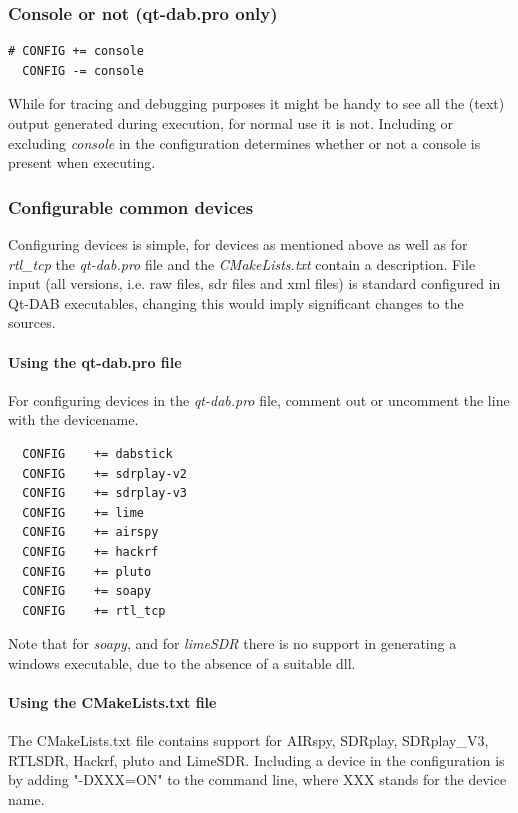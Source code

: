 \documentclass[12pt]{article}
\begin{document}
\subsubsection{Console or not (qt-dab.pro only)}
{\small
\begin{verbatim}
# CONFIG += console
  CONFIG -= console
\end{verbatim}
}

While for tracing and debugging purposes it might be handy to see
all the (text) output generated during execution, for normal
use it is not.
Including or excluding  {\em console} in the configuration
determines whether or not a console is present when executing.

\subsubsection{Configurable common devices}
Configuring devices is simple, for devices as mentioned above
as well as for {\em rtl\_tcp} the {\em qt-dab.pro} file 
and the {\em CMakeLists.txt} contain a description.
File input (all versions, i.e. raw files, sdr files and xml files) is
standard configured in Qt-DAB executables,
changing this would imply significant changes to the sources.

\paragraph{Using the qt-dab.pro file}
For configuring devices in the {\em qt-dab.pro} file, comment out or
uncomment the line with the devicename.
\begin{verbatim}
  CONFIG	+= dabstick
  CONFIG	+= sdrplay-v2
  CONFIG	+= sdrplay-v3
  CONFIG	+= lime
  CONFIG	+= airspy
  CONFIG	+= hackrf
  CONFIG	+= pluto
  CONFIG	+= soapy
  CONFIG	+= rtl_tcp
\end{verbatim}

Note that for {\em soapy}, and for {\em limeSDR} there is no support
in generating a windows executable, due to the absence of a suitable dll.

\paragraph{Using the CMakeLists.txt file}

The CMakeLists.txt file contains support for
AIRspy, SDRplay, SDRplay\_V3, RTLSDR, Hackrf, pluto and LimeSDR.
Including a device in the configuration is by adding "-DXXX=ON"
to the command line, where XXX stands for the device name.
\end{document}
